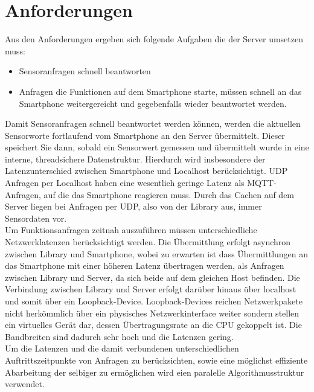 \documentclass[11pt,a4paper]{report}
\begin{document}
\section{Anforderungen}
Aus den Anforderungen ergeben sich folgende Aufgaben die der Server umsetzen muss:
\begin{itemize}
\item Sensoranfragen schnell beantworten
\item Anfragen die Funktionen auf dem Smartphone starte, müssen schnell an das Smartphone weitergereicht und gegebenfalls wieder beantwortet werden.
\end{itemize}
Damit Sensoranfragen schnell beantwortet werden können, werden die aktuellen Sensorworte fortlaufend vom Smartphone an den Server übermittelt.
Dieser speichert Sie dann, sobald ein Sensorwert gemessen und übermittelt wurde in eine interne, threadsichere Datenstruktur.
Hierdurch wird insbesondere der Latenzunterschied zwischen Smartphone und Localhost berücksichtigt.
UDP Anfragen per Localhost haben eine wesentlich geringe Latenz als MQTT-Anfragen, auf die das Smartphone reagieren muss.
Durch das Cachen auf dem Server liegen bei Anfragen per UDP, also von der Library aus, immer Sensordaten vor.
\\
Um Funktionsanfragen zeitnah auszuführen müssen unterschiedliche Netzwerklatenzen berücksichtigt werden.
Die Übermittlung erfolgt asynchron zwischen Library und Smartphone, wobei zu erwarten ist dass Übermittlungen an das Smartphone mit einer höheren Latenz übertragen werden, als Anfragen zwischen Library und Server, da sich beide auf dem gleichen Host befinden.
Die Verbindung zwischen Library und Server erfolgt darüber hinaus über localhost und somit über ein Loopback-Device.
Loopback-Devices reichen Netzwerkpakete nicht herkömmlich über ein physisches Netzwerkinterface weiter sondern stellen ein virtuelles Gerät dar, dessen Übertragungsrate an die CPU gekoppelt ist.
Die Bandbreiten sind dadurch sehr hoch und die Latenzen gering.
\\
Um die Latenzen und die damit verbundenen unterschiedlichen Auftrittszeitpunkte von Anfragen zu berücksichten, sowie eine möglichst effiziente Abarbeitung der selbiger zu ermöglichen wird eien paralelle Algorithmusstruktur verwendet.
\end{document}
